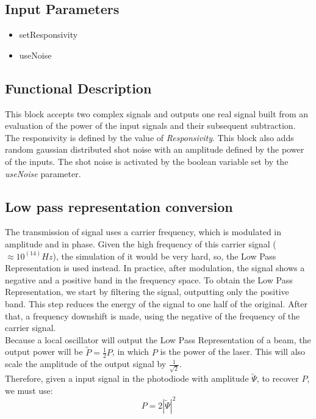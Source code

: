 \documentclass[../../sdf/tex/BPSK_system.tex]{subfiles}
\date{}
\begin{document}
\onlyinsubfile{\maketitle}

\subsection*{Input Parameters}

\begin{multicols}{2}
	\begin{itemize}
		\item setResponsivity
		\item useNoise
	\end{itemize}
\end{multicols}

\subsection*{Functional Description}

This block accepts two complex signals and outputs one real signal built from an evaluation of the power of the input signals and their subsequent subtraction. The responsivity is defined by the value of \textit{Responsivity}. This block also adds random gaussian distributed shot noise with an amplitude defined by the power of the inputs. The shot noise is activated by the boolean variable set by the \textit{useNoise} parameter.


\subsection*{Low pass representation conversion}

The transmission of signal uses a carrier frequency, which is modulated in amplitude and in phase. Given the high frequency of this carrier signal ($\approx 10^(14) Hz$), the simulation of it would be very hard, so, the Low Pass Representation is used instead. In practice, after modulation, the signal shows a negative and a positive band in the frequency space. To obtain the Low Pass Representation, we start by filtering the signal, outputting only the positive band. This step reduces the energy of the signal to one half of the original. After that, a frequency downshift is made, using the negative of the frequency of the carrier signal.\\
Because a local oscillator will output the Low Pass Representation of a beam, the output power will be $\tilde{P}=\frac{1}{2}P$, in which $P$ is the power of the laser. This will also scale the amplitude of the output signal by $\frac{1}{\sqrt{2}}$.\\
Therefore, given a input signal in the photodiode with amplitude $\tilde{\Psi}$, to recover $P$, we must use:
\begin{equation}
P = 2 |\tilde{\Psi}|^2
\end{equation}
\end{document}
